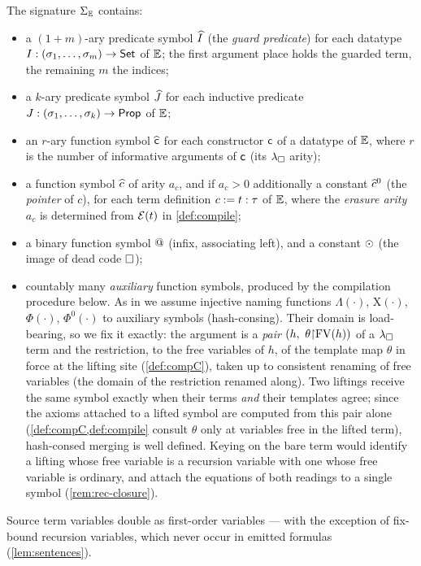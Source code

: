 \begin{definition}
\label{def:signature}
The signature $\Sigma_{\mathbb{E}}$ contains:
\begin{itemize}[leftmargin=2em]
\item a $(1{+}m)$-ary predicate symbol $\widehat{I}$ (the \emph{guard
  predicate}) for each datatype $I : (\sigma_1, \dots, \sigma_m) \to
  \mathsf{Set}$ of $\mathbb{E}$; the first argument place holds the guarded term, the
  remaining $m$ the indices;
\item a $k$-ary predicate symbol $\widehat{J}$ for each inductive predicate
  $J : (\sigma_1, \dots, \sigma_k) \to \mathsf{Prop}$ of $\mathbb{E}$;
\item an $r$-ary function symbol $\widehat{\mathsf{c}}$ for each constructor
  $\mathsf{c}$ of a datatype of $\mathbb{E}$, where $r$ is the number of
  informative arguments of $\mathsf{c}$ (its $\lambda_{\square}$ arity);
\item a function symbol $\widehat{c}$ of arity $a_c$, and if $a_c > 0$
  additionally a constant $\widehat{c}^0$ (the \emph{pointer} of $c$), for
  each term definition $c \mathrel{:=} t : \tau$ of $\mathbb{E}$, where the
  \emph{erasure arity} $a_c$ is determined from $\mathcal{E}(t)$ in
  \cref{def:compile};
\item a binary function symbol $\mathbin{@}$ (infix, associating left), and a
  constant $\odot$ (the image of dead code $\square$);
\item countably many \emph{auxiliary} function symbols, produced by the
  compilation procedure below.  As in \cite[\S 4]{Czajka2018} we assume
  injective naming functions $\Lambda(\cdot)$, $\mathrm{X}(\cdot)$,
  $\Phi(\cdot)$, $\Phi^0(\cdot)$ to auxiliary symbols (hash-consing).
  Their domain is load-bearing, so we fix it exactly: the argument is a
  \emph{pair} $(h,\ \theta{\restriction}\mathrm{FV}(h))$ of a $\lambda_{\square}$ term and the
  restriction, to the free variables of $h$, of the template map
  $\theta$ in force at the lifting site (\cref{def:compC}), taken up to
  consistent renaming of free variables (the domain of the restriction
  renamed along).  Two liftings receive the same symbol exactly when
  their terms \emph{and} their templates agree; since the axioms
  attached to a lifted symbol are computed from this pair alone
  (\cref{def:compC,def:compile} consult $\theta$ only at variables free
  in the lifted term), hash-consed merging is well defined.  Keying on
  the bare term would identify a lifting whose free variable is a
  recursion variable with one whose free variable is ordinary, and
  attach the equations of both readings to a single symbol
  (\cref{rem:rec-closure}).
\end{itemize}
Source term variables double as first-order variables --- with the
exception of fix-bound recursion variables, which never occur in
emitted formulas (\cref{lem:sentences}).
\end{definition}

